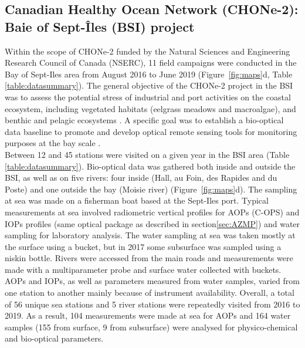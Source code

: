 \documentclass[essd, manuscript]{copernicus}
\begin{document}
\subsection{Canadian Healthy Ocean Network (CHONe-2): Baie of Sept-Îles (BSI) project}
Within the scope of CHONe-2 funded by the Natural Sciences and Engineering Research Council of Canada (NSERC), 11 field campaigns were conducted in the Bay of Sept-Iles area from August 2016 to June 2019 (Figure~\ref{fig:maps}d, Table \ref{table:datasummary}).  The general objective of the CHONe-2 project in the BSI was to assess the potential stress of industrial and port activities on the coastal ecosystem, including vegetated habitats (eelgrass meadows and macroalgae), and benthic and pelagic ecosystems \citep{Ferrario2022}. A specific goal was to establish a bio-optical data baseline to promote and develop optical remote sensing tools for monitoring purposes at the bay scale \citep[for details see][]{Araujo2022a, Araujo2022b}.\\

Between 12 and 45 stations were visited on a given year in the BSI area (Table \ref{table:datasummary}). Bio-optical data was gathered both inside and outside the BSI, as well as on five rivers: four inside (Hall, au Foin, des Rapides and du Poste) and one outside the bay (Moisie river) (Figure~\ref{fig:maps}d).  The sampling at sea was made on a fisherman boat based at the Sept-Iles port. Typical measurements at sea involved radiometric vertical profiles for AOPs (C-OPS) and IOPs profiles (same optical package as described in section\ref{sec:AZMP}) and water sampling for laboratory analysis. The water sampling at sea was taken mostly at the surface using a bucket, but in 2017 some subsurface was sampled using a niskin bottle. Rivers were accessed from the main roads and measurements were made with a multiparameter probe and surface water collected with buckets.\\

AOPs and IOPs, as well as parameters measured from water samples, varied from one station to another mainly because of instrument availability.   Overall, a total of 56 unique sea stations and 5 river stations were repeatedly visited from 2016 to 2019. As a result, 104 measurements were made at sea for AOPs and 164 water samples (155 from surface, 9 from subsurface) were analysed for physico-chemical and bio-optical parameters.\\
\end{document}
